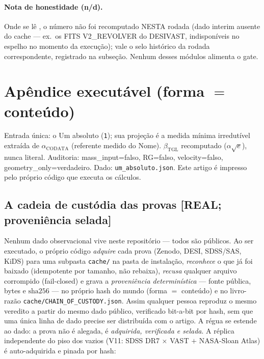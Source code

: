 \documentclass[11pt]{article}
\newcommand{\bTGL}{\beta_{\mathrm{TGL}}}\newcommand{\Msun}{M_{\odot}}\newcommand{\TGL}{\mathrm{TGL}}
\theoremstyle{definition}\newtheorem{deriv}{Derivação}
\begin{document}
\paragraph{Nota de honestidade (n/d).} Onde se lê , o número não foi recomputado NESTA rodada (dado interim ausente do cache --- ex.\ os FITS V2\_REVOLVER do DESIVAST, indisponíveis no espelho no momento da execução); vale o selo histórico da rodada correspondente, registrado na subseção. Nenhum desses módulos alimenta o gate.

\section*{Apêndice executável (forma $=$ conteúdo)}

Entrada única: o Um absoluto (\texttt{1}); sua projeção é a medida mínima irredutível extraída de $\alpha_{\mathrm{CODATA}}$ (referente medido do Nome). $\bTGL$ recomputado ($\alpha\sqrt{e}$), nunca literal. Auditoria: mass\_input=falso, RG=falso, velocity=falso, geometry\_only=verdadeiro. Dado: \texttt{um\_absoluto.json}. Este artigo é impresso pelo próprio código que executa os cálculos.


\subsection*{A cadeia de custódia das provas \textsf{[REAL; proveniência selada]}}

Nenhum dado observacional vive neste repositório --- todos são públicos. Ao ser executado, o próprio código \emph{adquire} cada prova (Zenodo, DESI, SDSS/SAS, KiDS) para uma subpasta \texttt{cache/} na pasta de instalação, \emph{reconhece} o que já foi baixado (idempotente por tamanho, não rebaixa), \emph{recusa} qualquer arquivo corrompido (fail-closed) e grava a \emph{proveniência determinística} --- fonte pública, bytes e $\mathrm{sha}256$ --- no próprio hash do mundo (forma $=$ conteúdo) e no livro-razão \texttt{cache/CHAIN\_OF\_CUSTODY.json}. Assim qualquer pessoa reproduz o mesmo veredito a partir do mesmo dado público, verificado bit-a-bit por hash, sem que uma única linha de dado precise ser distribuída com o artigo. A régua se estende ao dado: a prova não é alegada, é \emph{adquirida, verificada e selada}. A réplica independente do piso dos vazios (V11: SDSS DR7 $\times$ VAST $+$ NASA-Sloan Atlas) é auto-adquirida e pinada por hash:
\end{document}
